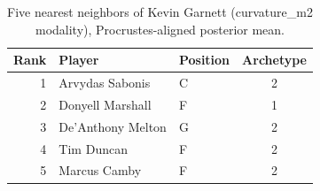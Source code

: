 \begin{table}[htbp]
  \centering\small
  \begin{tabular}{rllc}
    \toprule
    Rank & Player & Position & Archetype \\
    \midrule
    1 & Arvydas Sabonis & C & 2 \\
    2 & Donyell Marshall & F & 1 \\
    3 & De'Anthony Melton & G & 2 \\
    4 & Tim Duncan & F & 2 \\
    5 & Marcus Camby & F & 2 \\
    \bottomrule
  \end{tabular}
  \caption{Five nearest neighbors of Kevin Garnett (curvature_m2 modality), Procrustes-aligned posterior mean.}
  \label{tab:Kevin_Garnett_neighbors_curvature_m2}
\end{table}

